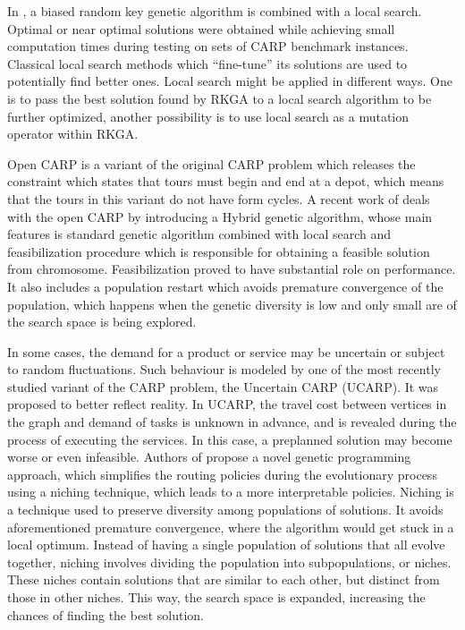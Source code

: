 \documentclass[twoside]{ctuthesis}
\theoremstyle{plain}
\theoremstyle{definition}
\theoremstyle{note}
\begin{document}
In \cite{martinez2011b}, a biased random key genetic algorithm is combined with a local search. Optimal or near optimal solutions were obtained while achieving small computation times during testing on sets of CARP benchmark instances. Classical local search methods which “fine-tune” its solutions are used to potentially find better ones. Local search might be applied in different ways. One is to pass the best solution found by RKGA to a local search algorithm to be further optimized, another possibility is to use local search as a mutation operator within RKGA.

Open CARP is a variant of the original CARP problem which releases the constraint which states that tours must begin and end at a depot, which means that the tours in this variant do not have form cycles. A recent work of \cite{arakaki2018hybrid} deals with the open CARP by introducing a Hybrid genetic algorithm, whose main features is standard genetic algorithm combined with local search and feasibilization procedure which is responsible for obtaining a feasible solution from chromosome. Feasibilization proved to have substantial role on performance. It also includes a population restart which avoids premature convergence of the population, which happens when the genetic diversity is low and only small are of the search space is being explored.

In some cases, the demand for a product or service may be uncertain or subject to random fluctuations. Such behaviour is modeled by one of the most recently studied variant of the CARP problem, the Uncertain CARP (UCARP). It was proposed to better reflect reality. In UCARP, the travel cost between vertices in the graph and demand of tasks is unknown in advance, and is revealed during the process of executing the services. In this case, a preplanned solution may become worse or even infeasible. Authors of \cite{wang2021genetic} propose a novel genetic programming approach, which simplifies the routing policies during the evolutionary process using a niching technique, which leads to a more interpretable policies. Niching is a technique used to preserve diversity among populations of solutions. It avoids aforementioned premature convergence, where the algorithm would get stuck in a local optimum. Instead of having a single population of solutions that all evolve together, niching involves dividing the population into subpopulations, or niches. These niches contain solutions that are similar to each other, but distinct from those in other niches. This way, the search space is expanded, increasing the chances of finding the best solution.
\end{document}
